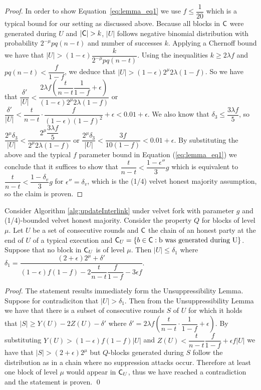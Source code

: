\begin{proof}
In order to show Equation~\ref{eq:lemma_eq1} we use $f \leq \dfrac{1}{20}$ which is a typical bound for our setting as discussed above.
Because all blocks in $\mathsf{C}$ were generated during $U$ and $\lvert \mathsf{C} \rvert > k $, $\lvert U \rvert$ follows negative binomial distribution with probability $2^{-\mu} pq(n-t)$ and number of successes $k$.
Applying a Chernoff bound we have that $\lvert U \rvert > (1-\epsilon) \dfrac{k}{2^{-\mu} pq(n-t)}$. Using the inequalities $k \geq 2\lambda f$ and $pq(n-t) < \dfrac{f}{1-f}$, we deduce that $\lvert U \rvert > (1-\epsilon) 2^{\mu}2\lambda(1-f)$. So we have that $\dfrac{\delta'}{\lvert U \rvert} < \dfrac{2\lambda f (\dfrac{t}{n-t} \dfrac{1}{1-f} + \epsilon)}{(1-\epsilon)2^{\mu}2\lambda (1-f)}$ or $\dfrac{\delta'}{\lvert U \rvert} < \dfrac{t}{n-t} \cdot \dfrac{f}{(1-\epsilon)(1-f)^2} + \epsilon < 0.01 + \epsilon$.
We also know that $\delta_3 \leq \dfrac{ 3\lambda f}{5}$, so
$\dfrac{2^{\mu} \delta_3}{\lvert U \rvert} < \dfrac{2^\mu \dfrac{ 3\lambda f}{5}}{2^{\mu} 2 \lambda (1-f)}$ or
$\dfrac{2^{\mu} \delta_3}{\lvert U \rvert} < \dfrac{3f}{10(1-f)} < 0.01 + \epsilon$.
By substituting the above and the typical $f$ parameter bound in Equation (\ref{eq:lemma_eq1}) we conclude that it suffices to show that $\dfrac{t}{n-t} < \dfrac{1-\epsilon''}{3}g$
which is equivalent to $\dfrac{t}{n-t} < \dfrac{1-\delta_v}{3}g$ for $\epsilon'' = \delta_v$, which is the (1/4) velvet honest majority assumption, so the claim is proven.
\end{proof}

\begin{lemma}\label{lem:claim1_lemma}
    Consider Algorithm \ref{alg:updateInterlink} under velvet fork with parameter $g$ and (1/4)-bounded velvet honest majority. Consider the  property $Q$ for blocks of level $\mu$. Let $U$ be a set of consecutive rounds and $\mathsf{C}$ the chain of an honest party at the end of $U$ of a typical execution and $\mathsf{C}_U = \{ b \in \mathsf{C}: \text{b was generated during U} \}$. Suppose that no block in $\mathsf{C}_U$ is of level $\mu$. Then $\lvert U \rvert \leq \delta_1$ where
    $\delta_1 = \dfrac{(2+\epsilon) 2^{\mu} + \delta'}{(1-\epsilon)f(1-f) - 2\dfrac{t}{n-t}\dfrac{f}{1-f} -3\epsilon f}$.
\end{lemma}
\begin{proof}
    The statement results immediately form the Unsuppressibility Lemma. Suppose for contradiciton that $\lvert U \rvert > \delta_1 $.
    Then from the Unsuppressibility Lemma we have that there is a subset of consecutive rounds $S$ of $U$ for which it holds that
    $\lvert S \rvert \geq Y(U) - 2Z(U) - \delta'$ where
    $\delta' = 2 \lambda f (\dfrac{t}{n-t} \cdot \dfrac{1}{1-f} + \epsilon)$. By substituting
    $Y(U) > (1-\epsilon)f(1-f) \lvert U \rvert$ and
    $Z(U) < \dfrac{t}{n-t} \dfrac{f}{1-f} +\epsilon f \lvert U \rvert$ we have that $\lvert S \rvert > (2+\epsilon)2^{\mu}$ but $Q$-blocks generated during $S$ follow the distribution as in a chain where no suppression attacks occur. Therefore at least one block of level $\mu$ would appear in $\mathsf{C}_U$, thus we have reached a contradiction and the statement is proven.
\qed
\end{proof}

